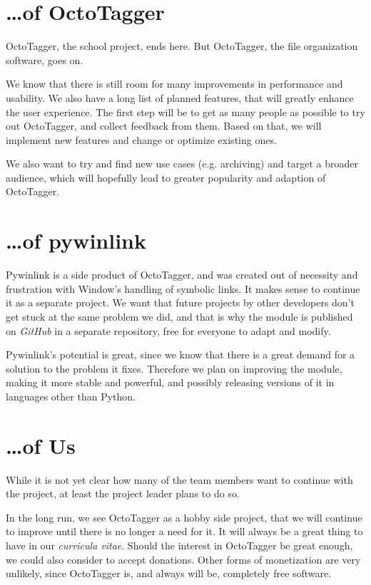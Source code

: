 \section{\ldots{}of OctoTagger}

OctoTagger, the school project, ends here. But OctoTagger, the file organization software, goes on.

We know that there is still room for many improvements in performance and usability. We also have a long list of planned features, that will greatly enhance the user experience.
The first step will be to get as many people as possible to try out OctoTagger, and collect feedback from them. Based on that, we will implement new features and change or optimize existing ones. 

We also want to try and find new use cases (e.g. archiving) and target a broader audience, which will hopefully lead to greater popularity and adaption of OctoTagger.

\section{\ldots{}of pywinlink}

Pywinlink is a side product of OctoTagger, and was created out of necessity and frustration with Window's handling of symbolic links. It makes sense to continue it as a separate project. We want that future projects by other developers don't get stuck at the same problem we did, and that is why the module is published on \textit{GitHub} in a separate repository, free for everyone to adapt and modify.

Pywinlink's potential is great, since we know that there is a great demand for a solution to the problem it fixes. Therefore we plan on improving the module, making it more stable and powerful, and possibly releasing versions of it in languages other than Python.

\section{\ldots{}of Us}

While it is not yet clear how many of the team members want to continue with the project, at least the project leader plans to do so.

In the long run, we see OctoTagger as a hobby side project, that we will continue to improve until there is no longer a need for it. It will always be a great thing to have in our \textit{curricula vitae}. Should the interest in OctoTagger be great enough, we could also consider to accept donations. Other forms of monetization are very unlikely, since OctoTagger is, and always will be, completely free software.
